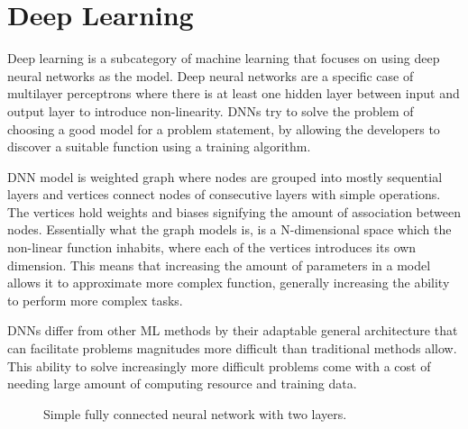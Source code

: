 \documentclass[12pt,a4paper,english
]{tunithesis}
\begin{document}
\section{Deep Learning}
Deep learning is a subcategory of machine learning that focuses on using deep neural networks as the model. Deep neural networks are a specific case of multilayer perceptrons where there is at least one hidden layer between input and output layer to introduce non-linearity. DNNs try to solve the problem of choosing a good model for a problem statement, by allowing the developers to discover a suitable function using a training algorithm.

DNN model is weighted graph where nodes are grouped into mostly sequential layers and vertices connect nodes of consecutive layers with simple operations. The vertices hold weights and biases signifying the amount of association between nodes. Essentially what the graph models is, is a N-dimensional space which the non-linear function inhabits, where each of the vertices introduces its own dimension.
This means that increasing the amount of parameters in a model allows it to approximate more complex function, generally increasing the ability to perform more complex tasks.~\cite{sze_efficient_2017}

DNNs differ from other ML methods by their adaptable general architecture that can facilitate problems magnitudes more difficult than traditional methods allow. This ability to solve increasingly more difficult problems come with a cost of needing large amount of computing resource and training data.

\begin{figure}
\centering
{}
\caption{Simple fully connected neural network with two layers.}
\label{fig:fc-layer}
\end{figure}
\end{document}
